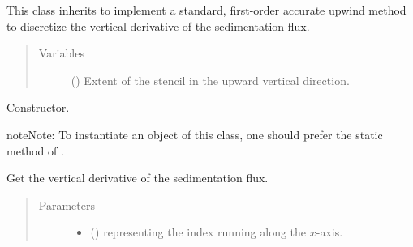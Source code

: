 \documentclass[letterpaper,10pt,english]{sphinxmanual}
\begin{document}

\begin{fulllineitems}
\label{\detokenize{api:tasmania.dycore.flux_sedimentation.FluxSedimentationUpwindFirstOrder}}
This class inherits  to implement a standard, first-order
accurate upwind method to discretize the vertical derivative of the sedimentation flux.
\begin{quote}\begin{description}
\item[{Variables}] \leavevmode
{\hyperref[\detokenize{api:tasmania.dycore.prognostic_isentropic.PrognosticIsentropic.nb}]{}} () \textendash{} Extent of the stencil in the upward vertical direction.

\end{description}\end{quote}

\begin{fulllineitems}
\label{\detokenize{api:tasmania.dycore.flux_sedimentation.FluxSedimentationUpwindFirstOrder.__init__}}
Constructor.

\begin{sphinxadmonition}{note}{Note:}
To instantiate an object of this class, one should prefer the static method
 of
.
\end{sphinxadmonition}

\end{fulllineitems}


\begin{fulllineitems}
\label{\detokenize{api:tasmania.dycore.flux_sedimentation.FluxSedimentationUpwindFirstOrder.get_vertical_derivative_of_sedimentation_flux}}
Get the vertical derivative of the sedimentation flux.
\begin{quote}\begin{description}
\item[{Parameters}] \leavevmode\begin{itemize}
\item {} 
 () \textendash{}  representing the index running along the \(x\)-axis.


\end{itemize}
\end{description}
\end{quote}
\end{fulllineitems}
\end{fulllineitems}
\end{document}

